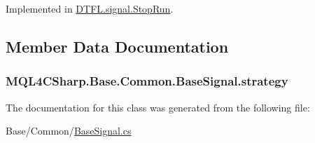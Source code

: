Implemented in \hyperlink{class_d_t_f_l_1_1signal_1_1_stop_run_a481d9353dbb82252a2bf5d36da1c8b45}{D\+T\+F\+L.\+signal.\+Stop\+Run}.



\subsection{Member Data Documentation}
\subsubsection[{\texorpdfstring{strategy}{strategy}}]{ M\+Q\+L4\+C\+Sharp.\+Base.\+Common.\+Base\+Signal.\+strategy}\hypertarget{class_m_q_l4_c_sharp_1_1_base_1_1_common_1_1_base_signal_adc5fd0efe0218a05bd5b0fb84c0d3814}{}\label{class_m_q_l4_c_sharp_1_1_base_1_1_common_1_1_base_signal_adc5fd0efe0218a05bd5b0fb84c0d3814}


The documentation for this class was generated from the following file\+:\begin{DoxyCompactItemize}
\item 
Base/\+Common/\hyperlink{_base_signal_8cs}{Base\+Signal.\+cs}\end{DoxyCompactItemize}
